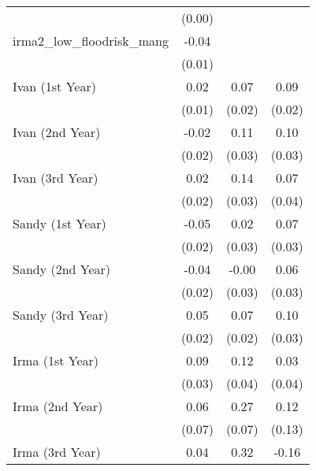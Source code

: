 {\begin{tabular}{l*{3}{c}}
                    &      (0.00)         &                     &                     \\
[1em]
irma2\_low\_floodrisk\_mang&       -0.04\sym{***}&                     &                     \\
                    &      (0.01)         &                     &                     \\
[1em]
Ivan (1st Year)     &        0.02         &        0.07\sym{**} &        0.09\sym{***}\\
                    &      (0.01)         &      (0.02)         &      (0.02)         \\
[1em]
Ivan (2nd Year)     &       -0.02         &        0.11\sym{***}&        0.10\sym{**} \\
                    &      (0.02)         &      (0.03)         &      (0.03)         \\
[1em]
Ivan (3rd Year)     &        0.02         &        0.14\sym{***}&        0.07         \\
                    &      (0.02)         &      (0.03)         &      (0.04)         \\
[1em]
Sandy (1st Year)    &       -0.05\sym{*}  &        0.02         &        0.07\sym{*}  \\
                    &      (0.02)         &      (0.03)         &      (0.03)         \\
[1em]
Sandy (2nd Year)    &       -0.04         &       -0.00         &        0.06         \\
                    &      (0.02)         &      (0.03)         &      (0.03)         \\
[1em]
Sandy (3rd Year)    &        0.05\sym{**} &        0.07\sym{**} &        0.10\sym{***}\\
                    &      (0.02)         &      (0.02)         &      (0.03)         \\
[1em]
Irma (1st Year)     &        0.09\sym{***}&        0.12\sym{***}&        0.03         \\
                    &      (0.03)         &      (0.04)         &      (0.04)         \\
[1em]
Irma (2nd Year)     &        0.06         &        0.27\sym{***}&        0.12         \\
                    &      (0.07)         &      (0.07)         &      (0.13)         \\
[1em]
Irma (3rd Year)     &        0.04         &        0.32\sym{**} &       -0.16         \\

\end{tabular}}
